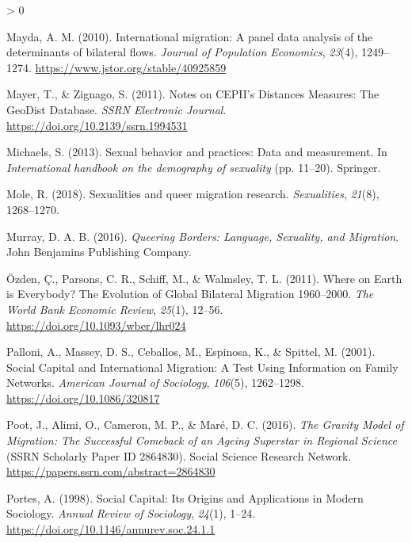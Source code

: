 \documentclass[
  11pt,
]{article}
\newlength{\cslhangindent}
\newenvironment{CSLReferences}[2] %
 {%
  \setlength{\parindent}{0pt}
  \ifodd #1 \everypar{\setlength{\hangindent}{\cslhangindent}}\ignorespaces\fi
  \ifnum #2 > 0
  \setlength{\parskip}{#2\baselineskip}
  \fi
 }%
 {}
\begin{document}
\begin{CSLReferences}{1}{0}
\leavevmode\hypertarget{ref-mayda_2010}{}%
Mayda, A. M. (2010). International migration: A panel data analysis of the determinants of bilateral flows. \emph{Journal of Population Economics}, \emph{23}(4), 1249--1274. \url{https://www.jstor.org/stable/40925859}

\leavevmode\hypertarget{ref-mayer_2011}{}%
Mayer, T., \& Zignago, S. (2011). Notes on {CEPII}'s {Distances} {Measures}: {The} {GeoDist} {Database}. \emph{SSRN Electronic Journal}. \url{https://doi.org/10.2139/ssrn.1994531}

\leavevmode\hypertarget{ref-michaels_2013}{}%
Michaels, S. (2013). Sexual behavior and practices: {Data} and measurement. In \emph{International handbook on the demography of sexuality} (pp. 11--20). Springer.

\leavevmode\hypertarget{ref-mole_2018a}{}%
Mole, R. (2018). Sexualities and queer migration research. \emph{Sexualities}, \emph{21}(8), 1268--1270.

\leavevmode\hypertarget{ref-murray_2016}{}%
Murray, D. A. B. (2016). \emph{Queering {Borders}: {Language}, {Sexuality}, and {Migration}}. John Benjamins Publishing Company.

\leavevmode\hypertarget{ref-ozden_2011}{}%
Özden, Ç., Parsons, C. R., Schiff, M., \& Walmsley, T. L. (2011). Where on {Earth} is {Everybody}? {The} {Evolution} of {Global} {Bilateral} {Migration} 1960--2000. \emph{The World Bank Economic Review}, \emph{25}(1), 12--56. \url{https://doi.org/10.1093/wber/lhr024}

\leavevmode\hypertarget{ref-palloni_2001}{}%
Palloni, A., Massey, D. S., Ceballos, M., Espinosa, K., \& Spittel, M. (2001). Social {Capital} and {International} {Migration}: {A} {Test} {Using} {Information} on {Family} {Networks}. \emph{American Journal of Sociology}, \emph{106}(5), 1262--1298. \url{https://doi.org/10.1086/320817}

\leavevmode\hypertarget{ref-poot_2016}{}%
Poot, J., Alimi, O., Cameron, M. P., \& Maré, D. C. (2016). \emph{The {Gravity} {Model} of {Migration}: {The} {Successful} {Comeback} of an {Ageing} {Superstar} in {Regional} {Science}} (SSRN Scholarly Paper ID 2864830). Social Science Research Network. \url{https://papers.ssrn.com/abstract=2864830}

\leavevmode\hypertarget{ref-portes_1998}{}%
Portes, A. (1998). Social {Capital}: {Its} {Origins} and {Applications} in {Modern} {Sociology}. \emph{Annual Review of Sociology}, \emph{24}(1), 1--24. \url{https://doi.org/10.1146/annurev.soc.24.1.1}


\end{CSLReferences}
\end{document}
